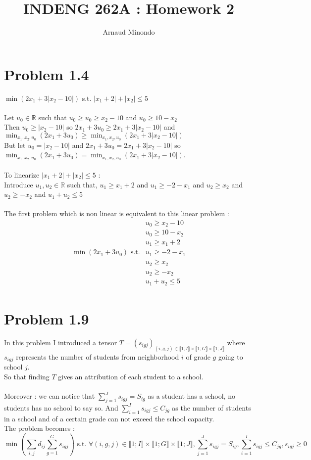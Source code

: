 \documentclass{article}
\title{INDENG 262A : Homework 2}
\author{Arnaud Minondo}
\begin{document}
\maketitle
\section*{Problem 1.4}
$\min(2x_1+3|x_2-10|)$ s.t. $|x_1+2|+|x_2|\leq5$
\\\\
Let $u_0\in\mathbb{R}$ such that $u_0\ge u_0\ge x_2-10$ and $u_0\ge 10-x_2$
\\
Then $u_0\ge |x_2-10|$ so $2x_1+3u_0\ge 2x_1+3|x_2-10|$ and $\min_{x_1,x_2,u_0}(2x_1+3u_0)\ge \min_{x_1,x_2,u_0}(2x_1+3|x_2-10|)$
\\
But let $u_0 = |x_2-10|$ and $2x_1+3u_0=2x_1+3|x_2-10|$ so $\min_{x_1,x_2,u_0}(2x_1+3u_0)=\min_{x_1,x_2,u_0}(2x_1+3|x_2-10|)$.
\\\\
To linearize $|x_1+2|+|x_2|\leq 5$ :
\\
Introduce $u_1,u_2\in\mathbb{R}$ such that, $u_1\ge x_1+2$ and $u_1\ge -2-x_1$ and $u_2\ge x_2$ and $u_2\ge-x_2$ and $u_1+u_2\leq 5$
\\\\
The first problem which is non linear is equivalent to this linear problem :\\
$$\boxed{\begin{array}{c|c}
    & u_0\ge x_2-10 \\
    & u_0\ge 10-x_2\\
    & u_1\ge x_1+2\\
    \min(2x_1+3u_0) \text{ s.t.}& u_1\ge -2-x_1\\
    & u_2\ge x_2 \\
    & u_2\ge-x_2\\
    & u_1+u_2\leq 5\\
\end{array}
}$$
\section*{Problem 1.9}
In this problem I introduced a tensor $T = (s_{igj})_{(i,g,j)\in\llbracket 1;I\rrbracket\times\llbracket 1;G\rrbracket\times\llbracket 1;J\rrbracket }$ where $s_{igj}$ represents the number of students from neighborhood $i$ of grade $g$ going to school $j$.
\\
So that finding $T$ gives an attribution of each student to a school.\\
\\
Moreover : we can notice that $\sum\limits_{j=1}^Js_{igj}=S_{ig}$ as a student has a school, no students has no school to say so. And $\sum\limits_{i=1}^Is_{igj}\leq C_{jg}$ as the number of students in a school and of a certain grade can not exceed the school capacity.
\\
The problem becomes : $$\boxed{\min(\sum\limits_{i,j}d_{ij}\sum\limits_{g=1}^Gs_{igj}) \text{ s.t. } \forall (i,g,j)\in\llbracket 1;I\rrbracket\times\llbracket 1;G\rrbracket\times\llbracket 1;J\rrbracket, \sum\limits_{j=1}^J s_{igj} = S_{ig}, \sum\limits_{i=1}^I s_{igj}\leq C_{jg}, s_{igj}\ge 0 }$$
\end{document}
